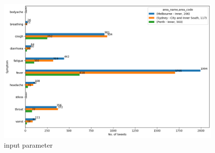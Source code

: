 \begin{figure}[H]
\centering
\includegraphics[scale=0.4]{city_analytics/report/images/symptoms_top_areas_sa4.png}
\caption{input parameter}
\label{fig:input parameter}
\end{figure}